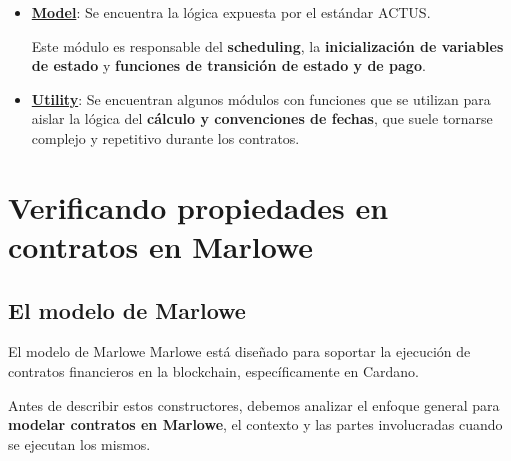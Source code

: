 \documentclass{beamer}
\begin{document}
\begin{frame}
    \begin{itemize}
        \item \textbf{\underline{Model}}: Se encuentra la lógica expuesta por el estándar ACTUS. 

            \medskip

            Este módulo es responsable del \textbf{scheduling}, la \textbf{inicialización de variables de estado} y \textbf{funciones de transición de estado y de pago}.

            \vfill
            \pause

        \item \textbf{\underline{Utility}}: Se encuentran algunos módulos con funciones que se utilizan para aislar la lógica del \textbf{cálculo y convenciones de fechas}, que suele tornarse complejo y repetitivo durante los contratos.
    \end{itemize}
\end{frame}



\section{Verificando propiedades en contratos en Marlowe}

\subsection{El modelo de Marlowe}

\begin{frame}{El modelo de Marlowe}
Marlowe está diseñado para soportar la ejecución de contratos financieros en la blockchain, específicamente en Cardano.

\vfill
\pause

Antes de describir estos constructores, debemos analizar el enfoque general para \textbf{modelar contratos en Marlowe}, el contexto y las partes involucradas cuando se ejecutan los mismos.

\end{frame}
\end{document}

